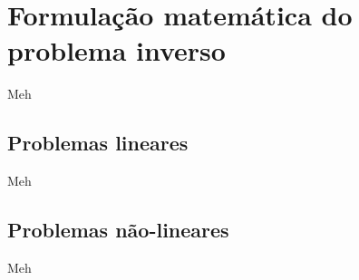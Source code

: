 \chapter{Formulação matemática do problema inverso}

Meh

\section{Problemas lineares}

Meh

\section{Problemas não-lineares}

Meh

